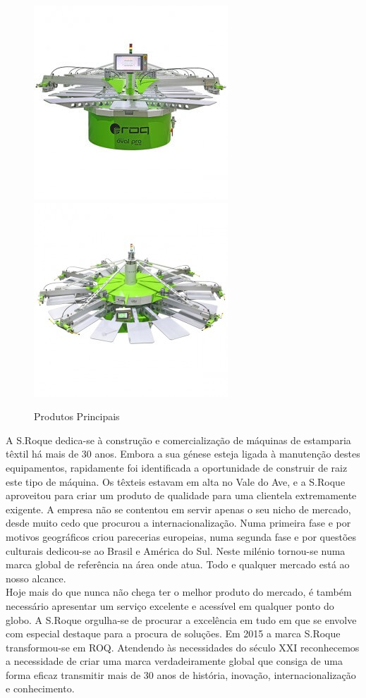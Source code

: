 \begin{figure}[ht]
\begin{center}
\includegraphics[scale=0.5]{./image/ROQ/maquinas/PRO-600x600-275x275.jpg}
\includegraphics[scale=0.5]{./image/ROQ/maquinas/You-600x600-275x275.jpg}
\end{center}
\caption{Produtos Principais}
\end{figure}
\newpage
A S.Roque dedica-se à construção e comercialização de máquinas de estamparia têxtil há mais de 30 anos. Embora a sua génese esteja ligada à manutenção destes equipamentos, rapidamente foi identificada a oportunidade de construir de raiz este tipo de máquina. Os têxteis estavam em alta no Vale do Ave, e a S.Roque aproveitou para criar um produto de qualidade para uma clientela extremamente exigente. A empresa não se contentou em servir apenas o seu nicho de mercado, desde muito cedo que procurou a internacionalização. Numa primeira fase e por motivos geográficos criou parecerias europeias, numa segunda fase e por questões culturais dedicou-se ao Brasil e América do Sul. Neste milénio tornou-se numa marca global de referência na área onde atua. Todo e qualquer mercado está ao nosso alcance.\\
Hoje mais do que nunca não chega ter o melhor produto do mercado, é também necessário apresentar um serviço excelente e acessível em qualquer ponto do globo. A S.Roque orgulha-se de procurar a excelência em tudo em que se envolve com especial destaque para a procura de soluções.
\emptyline
Em 2015 a marca S.Roque transformou-se em ROQ. Atendendo às necessidades do século XXI reconhecemos a necessidade de criar uma marca verdadeiramente global que consiga de uma forma eficaz transmitir mais de 30 anos de história, inovação, internacionalização e conhecimento.
